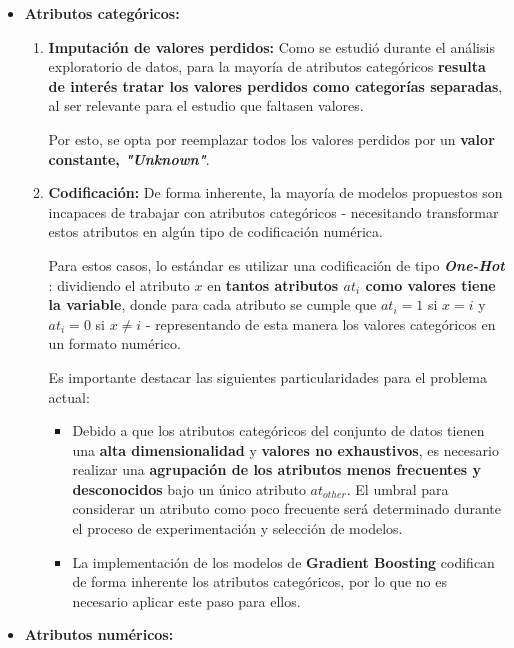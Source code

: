 \begin{itemize}[leftmargin=*, parsep=1pt, itemsep=1pt, topsep=4pt]
	\item \textbf{Atributos categóricos:}
	
	\begin{enumerate}
		\item \textbf{Imputación de valores perdidos:} Como se estudió durante el análisis exploratorio de datos, para la mayoría de atributos categóricos \textbf{resulta de interés tratar los valores perdidos como categorías separadas}, al ser relevante para el estudio que faltasen valores.
		
		Por esto, se opta por reemplazar todos los valores perdidos por un \textbf{valor constante, \textit{"Unknown"}}.
		
		\item \textbf{Codificación:} De forma inherente, la mayoría de modelos propuestos son incapaces de trabajar con atributos categóricos - necesitando transformar estos atributos en algún tipo de codificación numérica.
		
		Para estos casos, lo estándar es utilizar una codificación de tipo \textbf{\textit{One-Hot}} \cite{GVK022791892}: dividiendo el atributo $x$ en \textbf{tantos atributos $at_i$ como valores tiene la variable}, donde para cada atributo se cumple que $at_i=1$ si $x = i$ y $at_i=0$ si $x \neq i$ - representando de esta manera los valores categóricos en un formato numérico.
		
		Es importante destacar las siguientes particularidades para el problema actual:
		\begin{itemize}
			\item Debido a que los atributos categóricos del conjunto de datos tienen una \textbf{alta dimensionalidad} y \textbf{valores no exhaustivos}, es necesario realizar una \textbf{agrupación de los atributos menos frecuentes y desconocidos} bajo un único atributo $at_{other}$. El umbral para considerar un atributo como poco frecuente será determinado durante el proceso de experimentación y selección de modelos.
			\item La implementación de los modelos de \textbf{Gradient Boosting} codifican de forma inherente los atributos categóricos, por lo que no es necesario aplicar este paso para ellos.
		\end{itemize}
		 
	\end{enumerate}
	
	\item \textbf{Atributos numéricos:}
	

\end{itemize}
